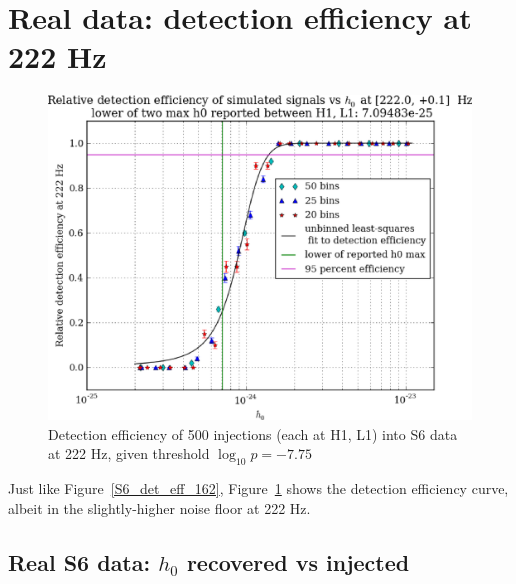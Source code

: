 


\section{Real data: detection efficiency at 222 Hz}

\begin{figure}
\begin{center}
\includegraphics[width=0.70\paperwidth,height=0.48\paperheight]{plots/detectionEfficiencyh0-222-0Hz.eps}
\caption{
Detection efficiency of 500 injections (each at H1, L1) into
S6 data at 222 Hz, given threshold $\log_{10}p = -7.75$}
\label{S6_det_eff_222}
\end{center}
\end{figure}

Just like Figure~\ref{S6_det_eff_162}, Figure~\ref{S6_det_eff_222} shows the detection efficiency curve, albeit in the slightly-higher noise floor at 222 Hz.

\subsection{Real S6 data: $h_0$ recovered vs injected}

